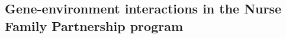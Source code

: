 \documentclass[12pt,letter]{article}\usepackage[]{graphicx}\usepackage[]{color}
\begin{document}
\subsection{Gene-environment interactions in the Nurse Family Partnership program}




\end{document}
